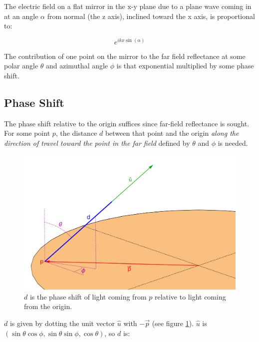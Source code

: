 \documentclass[etd,twoside,senior,noacknowledgments]{BYUPhys}
\begin{document}
The electric field on a flat mirror in the x-y plane due to a plane wave coming in at an angle $\alpha$ from normal (the z axis), inclined toward the x axis, is proportional to:

\begin{equation}
  e^{ikx\sin\left({\alpha}\right)}
\end{equation}

The contribution of one point on the mirror to the far field reflectance at some polar angle $\theta$ and azimuthal angle $\phi$ is that exponential multiplied by some phase shift.

\subsection{Phase Shift} \label{sec:phase_shift}

The phase shift relative to the origin suffices since far-field reflectance is sought. For some point $p$, the distance $d$ between that point and the origin \textit{along the direction of travel toward the point in the far field} defined by $\theta$ and $\phi$ is needed.

\begin{figure}
  \centerline{\includegraphics[width=\textwidth]{phase-length}}
  \caption[Phase length of a beam of light]{\label{fig:phase_length}
    $d$ is the phase shift of light coming from $p$ relative to light coming from the origin.}
\end{figure}

$d$ is given by dotting the unit vector $\hat{u}$ with $-\vec{p}$ (see figure \ref{fig:phase_length}). $\hat{u}$ is $\left(\sin{\theta}\cos{\phi},\sin{\theta}\sin{\phi},\cos{\theta}\right)$, so $d$ is:
\end{document}
